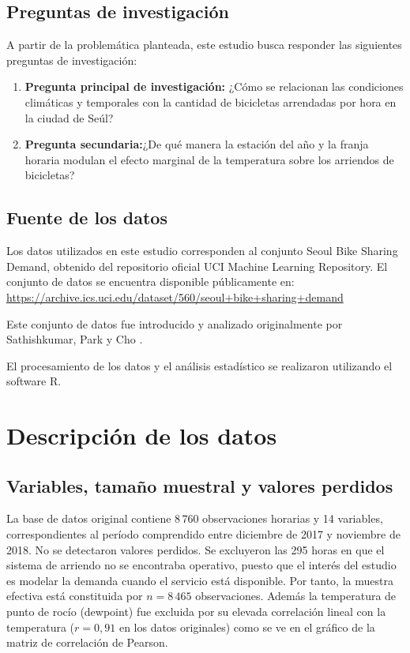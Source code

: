 \documentclass[12pt, a4paper]{article}
\numberwithin{equation}{section}
\begin{document}
\newpage

\subsection{Preguntas de investigación}

A partir de la problemática planteada, este estudio busca responder las siguientes preguntas de investigación:
\begin{enumerate}
    \item \textbf{Pregunta principal de investigación:} ¿Cómo se relacionan las condiciones climáticas y temporales con la cantidad de bicicletas arrendadas por hora en la ciudad de Seúl?
    \item \textbf{Pregunta secundaria:}¿De qué manera la estación del año y la franja horaria modulan el efecto marginal de la temperatura sobre los arriendos de bicicletas?
\end{enumerate}

\subsection{Fuente de los datos}

Los datos utilizados en este estudio corresponden al conjunto Seoul Bike Sharing Demand, obtenido del repositorio oficial UCI Machine Learning Repository.
El conjunto de datos se encuentra disponible públicamente en:
\url{https://archive.ics.uci.edu/dataset/560/seoul+bike+sharing+demand}

Este conjunto de datos fue introducido y analizado originalmente por Sathishkumar, Park y Cho \cite{sathish}.

El procesamiento de los datos y el análisis estadístico se realizaron utilizando el software R.

\FloatBarrier
\section{Descripción de los datos}

\subsection{Variables, tamaño muestral y valores perdidos}

La base de datos original contiene $8\,760$ observaciones horarias y 14 variables,
correspondientes al período comprendido entre diciembre de 2017 y noviembre de 2018. No se detectaron valores perdidos. Se excluyeron las 295 horas en que el sistema de arriendo no se encontraba operativo, puesto que el interés del estudio es modelar la demanda cuando el servicio está disponible. Por tanto, la muestra efectiva está constituida por $n=8\,465$ observaciones. Además la temperatura de punto de rocío (dewpoint) fue excluida por su elevada correlación lineal con la temperatura ($r=0{,}91$ en los datos originales) como se ve en el gráfico de la matriz de correlación de Pearson.
\end{document}
